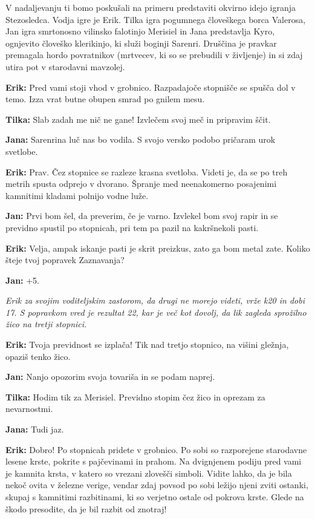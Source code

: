 V nadaljevanju ti bomo poskušali na primeru predstaviti okvirno idejo igranja Stezosledca. Vodja igre je Erik. Tilka igra pogumnega človeškega borca Valerosa, Jan igra smrtonosno vilinsko falotinjo Merisiel in Jana predstavlja Kyro, ognjevito človeško klerikinjo, ki služi boginji Sarenri. Druščina je pravkar premagala hordo povratnikov (mrtvecev, ki so se prebudili v življenje) in si zdaj utira pot v starodavni mavzolej.

\vspace{20pt}

\textbf{Erik:} Pred vami stoji vhod v grobnico. Razpadajoče stopnišče se spušča dol v temo. Izza vrat butne obupen smrad po gnilem mesu.

\textbf{Tilka:} Slab zadah me nič ne gane! Izvlečem svoj meč in pripravim ščit.

\textbf{Jana:} Sarenrina luč nas bo vodila. S svojo versko podobo pričaram urok svetlobe.

\textbf{Erik:} Prav. Čez stopnice se razleze krasna svetloba. Videti je, da se po treh metrih spusta odprejo v dvorano. Špranje med neenakomerno posajenimi kamnitimi kladami polnijo vodne luže.

\textbf{Jan:} Prvi bom šel, da preverim, če je varno. Izvlekel bom svoj rapir in se previdno spustil po stopnicah, pri tem pa pazil na kakršnekoli pasti.

\textbf{Erik:} Velja, ampak iskanje pasti je skrit preizkus, zato ga bom metal zate. Koliko šteje tvoj popravek Zaznavanja?

\textbf{Jan:} +5.

\vspace{20pt}

\textit{Erik za svojim voditeljskim zastorom, da drugi ne morejo videti, vrže k20 in dobi 17. S popravkom vred je rezultat 22, kar je več kot dovolj, da lik zagleda sprožilno žico na tretji stopnici.}

\vspace{20pt}

\textbf{Erik:} Tvoja previdnost se izplača! Tik nad tretjo stopnico, na višini gležnja, opaziš tenko žico.

\textbf{Jan:} Nanjo opozorim svoja tovariša in se podam naprej.

\textbf{Tilka:} Hodim tik za Merisiel. Previdno stopim čez žico in oprezam za nevarnostmi.

\textbf{Jana:} Tudi jaz.

\textbf{Erik:} Dobro! Po stopnicah pridete v grobnico. Po sobi so razporejene starodavne lesene krste, pokrite s pajčevinami in prahom. Na dvignjenem podiju pred vami je kamnita krsta, v katero so vrezani zlovešči simboli. Vidite lahko, da je bila nekoč ovita v železne verige, vendar zdaj povsod po sobi ležijo njeni zviti ostanki, skupaj s kamnitimi razbitinami, ki so verjetno ostale od pokrova krste. Glede na škodo presodite, da je bil razbit od znotraj!

